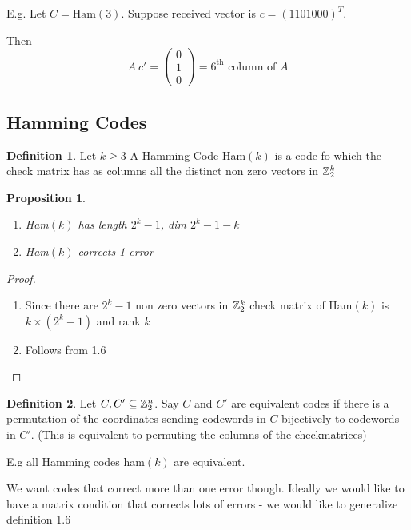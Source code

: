 \documentclass[]{article}
\newtheorem{prop}[thm]{Proposition}
\theoremstyle{definition}
\newtheorem*{defn}{Definition}
\theoremstyle{remark}
\numberwithin{equation}{section}
\begin{document}
		E.g. Let $C = \text{Ham}(3)$.
		Suppose received vector is $c= (1101000)^T$.

		Then \[
			A\ c' = \left(\begin{smallmatrix}0\\1\\0\end{smallmatrix}\right) = \text{$6^\text{th}$ column of $A$}
		\]
	\subsection{Hamming Codes}

		\begin{defn}
		Let $k\geq3$ A Hamming Code Ham$(k)$ is a code fo which the check matrix has as columns all the distinct non zero vectors in $\mathbb{Z}_2^k$
		\end{defn}


		\begin{prop}
		\begin{enumerate}
			\item Ham$(k)$ has length $2^k-1$, dim $2^k-1 - k$
			\item Ham$(k)$ corrects 1 error
		\end{enumerate}
		\end{prop}
		\begin{proof}
			\par
			\begin{enumerate}
			\item\par
				Since there are $2^k-1$ non zero vectors in $\mathbb{Z}_2^k$ check matrix of Ham$(k)$ is $k\times (2^k-1)$ and rank $k$
			\item\par
				Follows from 1.6
			\end{enumerate}
		\end{proof}

		\begin{defn}
		Let $C, C' \subseteq \mathbb{Z}_2^n$. Say $C$ and $C'$ are equivalent codes if there is a permutation of the coordinates sending codewords in $C$ bijectively to codewords in $C'$. (This is equivalent to permuting the columns of the checkmatrices)
		\end{defn}

		E.g all Hamming codes ham$(k)$ are equivalent.

		We want codes that correct more than one error though. Ideally we would like to have a matrix condition that corrects lots of errors - we would like to generalize definition 1.6
\end{document}
